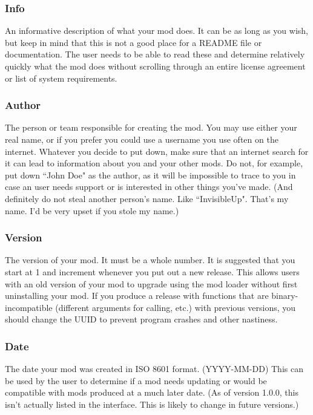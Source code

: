 \documentclass[12pt,a4paper,notitlepage]{article}
\begin{document}
\subsubsection{Info}
\label{subsubsec:create-meta-desc}
An informative description of what your mod does. It can be as long as you wish, but keep in mind that this is not a good place for a README file or documentation. The user needs to be able to read these and determine relatively quickly what the mod does without scrolling through an entire license agreement or list of system requirements.

\subsubsection{Author}
\label{subsubsec:create-meta-auth}
The person or team responsible for creating the mod. You may use either your real name, or if you prefer you could use a username you use often on the internet. Whatever you decide to put down, make sure that an internet search for it can lead to information about you and your other mods. Do not, for example, put down ``John Doe" as the author, as it will be impossible to trace to you in case an user needs support or is interested in other things you've made. (And definitely do not steal another person's name. Like ``InvisibleUp". That's my name. I'd be very upset if you stole my name.)

\subsubsection{Version}
\label{subsubsec:create-meta-ver}
The version of your mod. It must be a whole number. It is suggested that you start at 1 and increment whenever you put out a new release. This allows users with an old version of your mod to upgrade using the mod loader without first uninstalling your mod. If you produce a release with functions that are binary-incompatible (different arguments for calling, etc.) with previous versions, you should change the UUID to prevent program crashes and other nastiness.

\subsubsection{Date}
\label{subsubsec:create-meta-date}
The date your mod was created in ISO 8601 format. (YYYY-MM-DD) This can be used by the user to determine if a mod needs updating or would be compatible with mods produced at a much later date. (As of version 1.0.0, this isn't actually listed in the interface. This is likely to change in future versions.)
\end{document}
